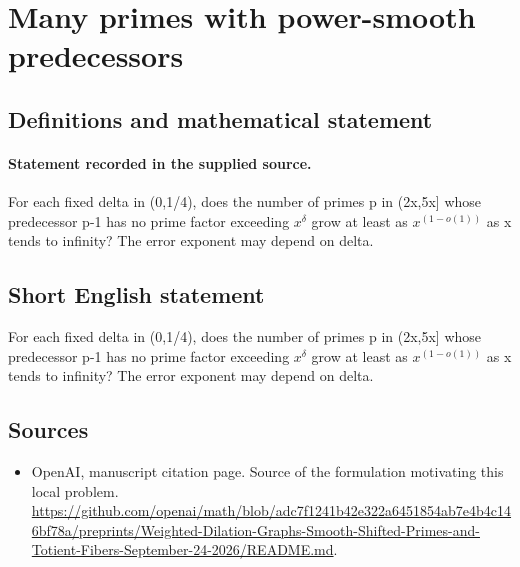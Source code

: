 \documentclass[11pt]{article}
\begin{document}
\section*{Many primes with power-smooth predecessors}\label{statement}
\subsection{Definitions and mathematical statement}
\paragraph{Statement recorded in the supplied source.}
For each fixed delta in (0,1/4), does the number of primes p in (2x,5x] whose predecessor p-1 has no prime factor exceeding $x^\delta $ grow at least as $x^(1-o(1))$ as x tends to infinity? The error exponent may depend on delta.
\subsection{Short English statement}
For each fixed delta in (0,1/4), does the number of primes p in (2x,5x] whose predecessor p-1 has no prime factor exceeding $x^\delta $ grow at least as $x^(1-o(1))$ as x tends to infinity? The error exponent may depend on delta.
\subsection{Sources}
\begin{itemize}
\item[S1] OpenAI, manuscript citation page. Source of the formulation motivating this local problem.
\url{https://github.com/openai/math/blob/adc7f1241b42e322a6451854ab7e4b4c146bf78a/preprints/Weighted-Dilation-Graphs-Smooth-Shifted-Primes-and-Totient-Fibers-September-24-2026/README.md}.
\end{itemize}
\end{document}
